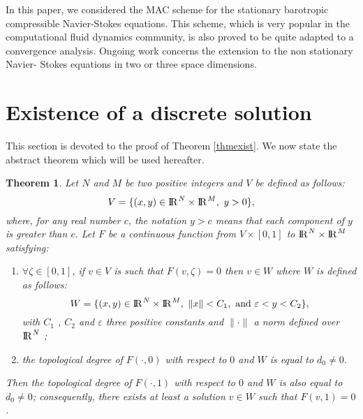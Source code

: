 \documentclass{amsart}
\newtheorem{thm}{Theorem}
\numberwithin{equation}{section}
\begin{document}
In this paper, we considered the MAC scheme for the stationary baro\-tro\-pic compressible Navier-Stokes equations. This scheme, which is very popular in the computational fluid dynamics community, is also proved to be quite adapted to a convergence analysis.
Ongoing work concerns the extension to the non stationary  Navier- Stokes equations in two or three space dimensions.

\appendix

\section{Existence of a discrete solution}\label{existproof}

This section is devoted to the proof of Theorem \ref{thmexist}.
We now state the abstract theorem which will be used hereafter.

\begin{thm}\label{topologicaldegreethm}
Let $N$ and $M$ be two positive integers and $V$ be defined as follows:
\begin{equation*}
V = \{ (x,y) \in {\ifmmode{\rm	I\mkern-3.1mu
R\mkern1mu}\else{\rm I\kern-.18em 
R\hskip1pt\	}\fi\relax}^N \times {\ifmmode{\rm	I\mkern-3.1mu
R\mkern1mu}\else{\rm I\kern-.18em 
R\hskip1pt\	}\fi\relax}^M, \ y>0 \},
\end{equation*}
where, for any real number $c$, the notation $y > c$ means that each component of $y$ is greater than $c$. Let  $ F $ be a continuous function from  $V \times [0,1]$ to ${\ifmmode{\rm	I\mkern-3.1mu
R\mkern1mu}\else{\rm I\kern-.18em 
R\hskip1pt\	}\fi\relax}^N \times {\ifmmode{\rm	I\mkern-3.1mu
R\mkern1mu}\else{\rm I\kern-.18em 
R\hskip1pt\	}\fi\relax}^M$ satisfying:
\begin{enumerate}
\item $\forall \zeta \in [0,1] $, if $ v \in V $ is such that $ F(v,\zeta)=0 $ then $ v \in W $ where $W$ is defined as follows:
\begin{equation*}
W = \{ (x,y) \in {\ifmmode{\rm	I\mkern-3.1mu
R\mkern1mu}\else{\rm I\kern-.18em 
R\hskip1pt\	}\fi\relax}^N \times {\ifmmode{\rm	I\mkern-3.1mu
R\mkern1mu}\else{\rm I\kern-.18em 
R\hskip1pt\	}\fi\relax}^M, \ \| x\| < C_1, \ \text{and} \ \varepsilon < y < C_2 \},
\end{equation*}
with $C_1$ , $C_2$ and $\varepsilon$ three positive constants and $ \| \cdot \| $ a norm defined over ${\ifmmode{\rm	I\mkern-3.1mu
R\mkern1mu}\else{\rm I\kern-.18em 
R\hskip1pt\	}\fi\relax}^N$ ;
\item the topological degree of $F (\cdot, 0)$ with respect to $0$ and $W$ is equal to $d_0 \ne 0$.
\end{enumerate}
Then the topological degree of $F (\cdot, 1)$ with respect to $0$ and $W$ is also equal to $d_0  \ne 0$; consequently, there exists
at least a solution $ v \in W$ such that $F(v,1) = 0$.
\end{thm}
\end{document}
